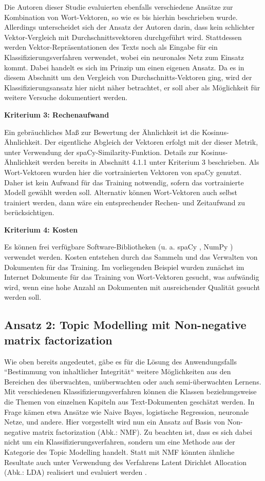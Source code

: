 Die Autoren dieser Studie \cite{dilawar} evaluierten ebenfalls verschiedene Ansätze zur Kombination von Wort-Vektoren, so wie es bis hierhin beschrieben wurde. Allerdings unterscheidet sich der Ansatz der Autoren darin, dass kein schlichter Vektor-Vergleich mit Durchschnittsvektoren durchgeführt wird. Stattdessen werden Vektor-Repräsentationen des Texts noch als Eingabe für ein Klassifizierungsverfahren verwendet, wobei ein neuronales Netz zum Einsatz kommt. Dabei handelt es sich im Prinzip um einen eigenen Ansatz. Da es in diesem Abschnitt um den Vergleich von Durchschnitts-Vektoren ging, wird der Klassifizierungsansatz hier nicht näher betrachtet, er soll aber als Möglichkeit für weitere Versuche dokumentiert werden.


{\bf Kriterium 3: Rechenaufwand}

Ein gebräuchliches Maß zur Bewertung der Ähnlichkeit ist die Kosinus-Ähnlichkeit. Der eigentliche Abgleich der Vektoren erfolgt mit der dieser Metrik, unter Verwendung der spaCy-Similarity-Funktion. Details zur Kosinus-Ähnlichkeit werden bereits in Abschnitt 4.1.1 unter Kriterium 3 beschrieben. Als Wort-Vektoren wurden hier die vortrainierten Vektoren von spaCy genutzt. Daher ist kein Aufwand für das Training notwendig, sofern das vortrainierte Modell gewählt werden soll. Alternativ können Wort-Vektoren auch selbst trainiert werden, dann wäre ein entsprechender Rechen- und Zeitaufwand zu berücksichtigen.

{\bf Kriterium 4: Kosten}

Es können frei verfügbare Software-Bibliotheken (u. a. spaCy \cite{spacy-license}, NumPy \cite{numpy-license}) verwendet werden. Kosten entstehen durch das Sammeln und das Verwalten von Dokumenten für das Training. Im vorliegenden Beispiel wurden zunächst im Internet Dokumente für das Training von Wort-Vektoren gesucht, was aufwändig wird, wenn eine hohe Anzahl an Dokumenten mit ausreichender Qualität gesucht werden soll.

\subsection{Ansatz 2: Topic Modelling mit Non-negative matrix factorization}

Wie oben bereits angedeutet, gäbe es für die Lösung des Anwendungsfalls ``Bestimmung von inhaltlicher Integrität`` weitere Möglichkeiten aus den Bereichen des überwachten, unüberwachten oder auch semi-überwachten Lernens. Mit verschiedenen Klassifizierungsverfahren können die Klassen beziehungsweise die Themen von einzelnen Kapiteln aus Text-Dokumenten geschätzt werden. In Frage kämen etwa Ansätze wie Naive Bayes, logistische Regression, neuronale Netze, und andere. Hier vorgestellt wird nun ein Ansatz auf Basis von Non-negative matrix factorization (Abk.: NMF). Zu beachten ist, dass es sich dabei nicht um ein Klassifizierungsverfahren, sondern um eine Methode aus der Kategorie des Topic Modelling handelt. Statt mit NMF könnten ähnliche Resultate auch unter Verwendung des Verfahrens Latent Dirichlet Allocation (Abk.: LDA) realisiert und evaluiert werden \cite{scikit1}.

